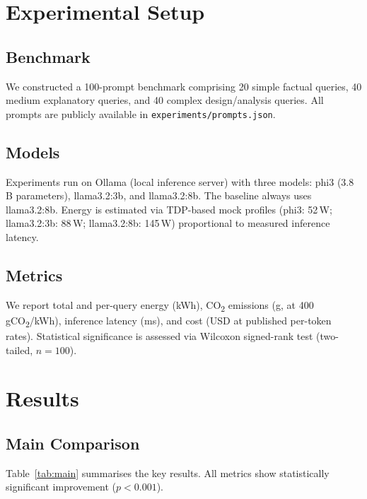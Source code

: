 \documentclass[conference]{IEEEtran}
\begin{document}
\section{Experimental Setup}

\subsection{Benchmark}
We constructed a 100-prompt benchmark comprising 20 simple factual queries,
40 medium explanatory queries, and 40 complex design/analysis queries.
All prompts are publicly available in \texttt{experiments/prompts.json}.

\subsection{Models}
Experiments run on Ollama (local inference server) with three models:
phi3 (3.8\,B parameters), llama3.2:3b, and llama3.2:8b. The baseline
always uses llama3.2:8b. Energy is estimated via TDP-based mock profiles
(phi3: 52\,W; llama3.2:3b: 88\,W; llama3.2:8b: 145\,W) proportional to
measured inference latency.

\subsection{Metrics}
We report total and per-query energy (kWh), CO\textsubscript{2} emissions (g,
at 400\,gCO\textsubscript{2}/kWh), inference latency (ms), and cost (USD at
published per-token rates). Statistical significance is assessed via Wilcoxon
signed-rank test (two-tailed, $n=100$).

\section{Results}

\subsection{Main Comparison}

Table~\ref{tab:main} summarises the key results. All metrics show statistically
significant improvement ($p < 0.001$).
\end{document}
